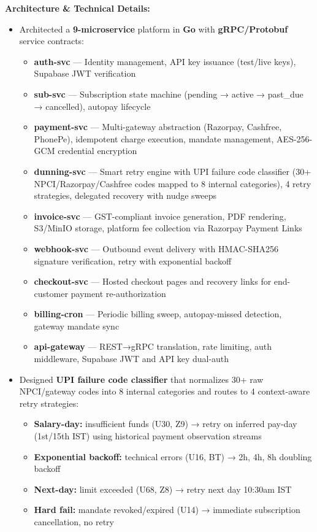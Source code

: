 \documentclass[letterpaper,10pt]{article}
\begin{document}
\vspace{4pt}
\noindent\textbf{Architecture \& Technical Details:}
\begin{itemize}
  \item Architected a \textbf{9-microservice} platform in \textbf{Go} with \textbf{gRPC/Protobuf} service contracts:
    \begin{itemize}[label=$\circ$, leftmargin=1em, itemsep=0pt]
      \item \textbf{auth-svc} — Identity management, API key issuance (test/live keys), Supabase JWT verification
      \item \textbf{sub-svc} — Subscription state machine (pending → active → past\_due → cancelled), autopay lifecycle
      \item \textbf{payment-svc} — Multi-gateway abstraction (Razorpay, Cashfree, PhonePe), idempotent charge execution, mandate management, AES-256-GCM credential encryption
      \item \textbf{dunning-svc} — Smart retry engine with UPI failure code classifier (30+ NPCI/Razorpay/Cashfree codes mapped to 8 internal categories), 4 retry strategies, delegated recovery with nudge sweeps
      \item \textbf{invoice-svc} — GST-compliant invoice generation, PDF rendering, S3/MinIO storage, platform fee collection via Razorpay Payment Links
      \item \textbf{webhook-svc} — Outbound event delivery with HMAC-SHA256 signature verification, retry with exponential backoff
      \item \textbf{checkout-svc} — Hosted checkout pages and recovery links for end-customer payment re-authorization
      \item \textbf{billing-cron} — Periodic billing sweep, autopay-missed detection, gateway mandate sync
      \item \textbf{api-gateway} — REST→gRPC translation, rate limiting, auth middleware, Supabase JWT and API key dual-auth
    \end{itemize}

  \item Designed \textbf{UPI failure code classifier} that normalizes 30+ raw NPCI/gateway codes into 8 internal categories and routes to 4 context-aware retry strategies:
    \begin{itemize}[label=$\circ$, leftmargin=1em, itemsep=0pt]
      \item \textbf{Salary-day:} insufficient funds (U30, Z9) → retry on inferred pay-day (1st/15th IST) using historical payment observation streams
      \item \textbf{Exponential backoff:} technical errors (U16, BT) → 2h, 4h, 8h doubling backoff
      \item \textbf{Next-day:} limit exceeded (U68, Z8) → retry next day 10:30am IST
      \item \textbf{Hard fail:} mandate revoked/expired (U14) → immediate subscription cancellation, no retry
    \end{itemize}


\end{itemize}
\end{document}
